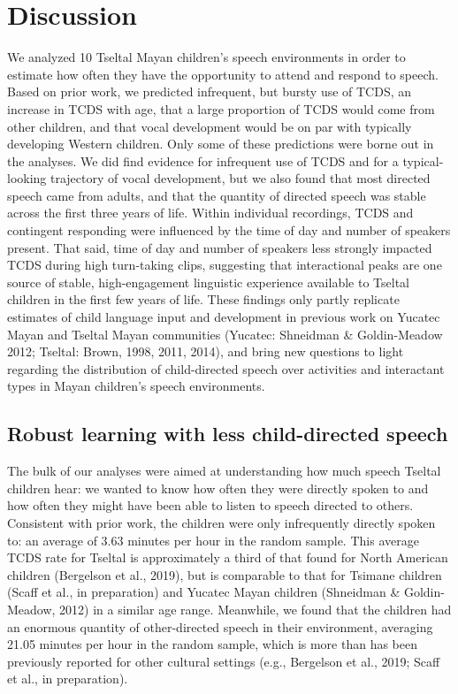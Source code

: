 \documentclass[floatsintext,man]{apa6}
\theoremstyle{definition}
\theoremstyle{definition}
\theoremstyle{definition}
\theoremstyle{remark}
\begin{document}
\section{Discussion}\label{disc}

We analyzed 10 Tseltal Mayan children's speech environments in order to
estimate how often they have the opportunity to attend and respond to
speech. Based on prior work, we predicted infrequent, but bursty use of
TCDS, an increase in TCDS with age, that a large proportion of TCDS
would come from other children, and that vocal development would be on
par with typically developing Western children. Only some of these
predictions were borne out in the analyses. We did find evidence for
infrequent use of TCDS and for a typical-looking trajectory of vocal
development, but we also found that most directed speech came from
adults, and that the quantity of directed speech was stable across the
first three years of life. Within individual recordings, TCDS and
contingent responding were influenced by the time of day and number of
speakers present. That said, time of day and number of speakers less
strongly impacted TCDS during high turn-taking clips, suggesting that
interactional peaks are one source of stable, high-engagement linguistic
experience available to Tseltal children in the first few years of life.
These findings only partly replicate estimates of child language input
and development in previous work on Yucatec Mayan and Tseltal Mayan
communities (Yucatec: Shneidman \& Goldin-Meadow 2012; Tseltal: Brown,
1998, 2011, 2014), and bring new questions to light regarding the
distribution of child-directed speech over activities and interactant
types in Mayan children's speech environments.

\subsection{Robust learning with less child-directed
speech}\label{robust-learning-with-less-child-directed-speech}

The bulk of our analyses were aimed at understanding how much speech
Tseltal children hear: we wanted to know how often they were directly
spoken to and how often they might have been able to listen to speech
directed to others. Consistent with prior work, the children were only
infrequently directly spoken to: an average of 3.63 minutes per hour in
the random sample. This average TCDS rate for Tseltal is approximately a
third of that found for North American children (Bergelson et al.,
2019), but is comparable to that for Tsimane children (Scaff et al., in
preparation) and Yucatec Mayan children (Shneidman \& Goldin-Meadow,
2012) in a similar age range. Meanwhile, we found that the children had
an enormous quantity of other-directed speech in their environment,
averaging 21.05 minutes per hour in the random sample, which is more
than has been previously reported for other cultural settings (e.g.,
Bergelson et al., 2019; Scaff et al., in preparation).
\end{document}
